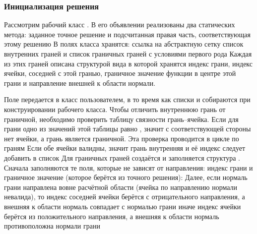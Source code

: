 \subsubsection{Инициализация решения}
Рассмотрим рабочий класс .
В его объявлении реализованы два статических метода:
заданное точное решение
и подсчитанная правая часть, соответствующая этому решению
В полях класса хранятся: ссылка на абстрактную сетку
список внутренних граней
и список граничных граней с условиями первого рода
Каждая из этих граней описана структурой вида
в которой хранятся индекс грани,
индекс ячейки, соседней с этой гранью,
граничное значение функции в центре этой грани
и направление внешней к области нормали.

Поле  передается в класс пользователем,
в то время как списки  и 
собираются при конструировании рабочего класса.
Чтобы отличить внутреннюю грань от граничной, необходимо
проверить таблицу связности грань--ячейка. Если
для грани одно из значений этой таблицы равно ,
значит с соответствующей стороны нет ячейки, а грань является граничной.
Эта проверка проводится в цикле по граням
Если обе ячейки валидны, значит грань внутренняя и её индекс
следует добавить в список 
Для граничных граней создаётся и заполняется структура
. Сначала заполняются те поля,
которые не зависят от направления: индекс грани и
граничное значение (которое берётся из точного решения):
Далее, если нормаль грани направлена вовне
расчётной области (ячейка по направлению нормали невалида),
то индекс соседней ячейки берётся с отрицательного направления,
а внешняя к области нормаль совпадает с нормалью грани
иначе индекс ячейки берётся из положительного направления,
а внешняя к области нормаль противоположна нормали грани

